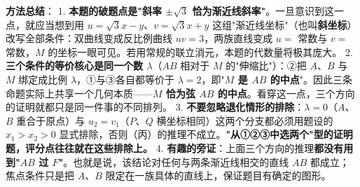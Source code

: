 \begin{answer}
\begin{gktip}
\textbf{方法总结}：
1. \textbf{本题的破题点是"斜率 $\pm\sqrt3$ 恰为渐近线斜率"}。一旦意识到这一点，就应当想到用 $u=\sqrt3x-y$、$v=\sqrt3x+y$ 这组"渐近线坐标"（也叫\textbf{斜坐标}）改写全部条件：双曲线变成反比例曲线 $uv=3$，两族直线变成 $u=$ 常数与 $v=$ 常数，$M$ 的坐标一眼可见。若用常规的联立消元，本题的代数量将极其庞大。
2. \textbf{三个条件的等价核心是同一个数 $\lambda$}（$AB$ 相对于 $M$ 的"伸缩比"）：②把 $A$、$B$ 与 $M$ 绑定成比例 $\lambda$，①与③各自都等价于 $\lambda=2$，即"\textbf{$M$ 是 $AB$ 的中点}"。因此三条命题实际上共享一个几何本质——\textbf{$M$ 恰为弦 $AB$ 的中点}。看穿这一点，三个方向的证明就都只是同一件事的不同排列。
3. \textbf{不要忽略退化情形的排除}：$\lambda=0$（$A$、$B$ 重合于原点）与 $u_2=v_1$（$P$、$Q$ 横坐标相同）这两个分支都必须用题设的 $x_1>x_2>0$ 显式排除，否则（丙）的推理不成立。\textbf{"从①②③中选两个"型的证明题，评分点往往就在这些排除上。}
4. \textbf{有趣的旁证}：上面三个方向的推理\textbf{都没有用到"$AB$ 过 $F$"}。也就是说，该结论对任何与两条渐近线相交的直线 $AB$ 都成立；焦点条件只是把 $A$、$B$ 限定在一族具体的直线上，保证题目有确定的图形。
\end{gktip}



\par\medskip

\end{answer}
